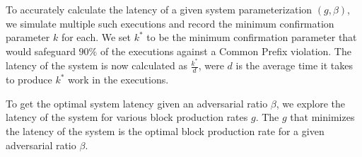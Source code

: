 To accurately calculate the latency of a given system parameterization $(g, \beta)$, we simulate multiple such executions and record the minimum confirmation
parameter $k$ for each. We set $k^*$ to be the minimum confirmation parameter that would safeguard $90\%$ of the executions against a Common Prefix violation.
The latency of the system is now calculated as $\frac{k^*}{d}$, were $d$ is the average time it takes to produce $k^*$ work in the executions.

To get the optimal system latency given an adversarial ratio $\beta$, we explore the latency of the system for various block production rates $g$.
The $g$ that minimizes the latency of the system is the optimal block production rate for a given adversarial ratio $\beta$.